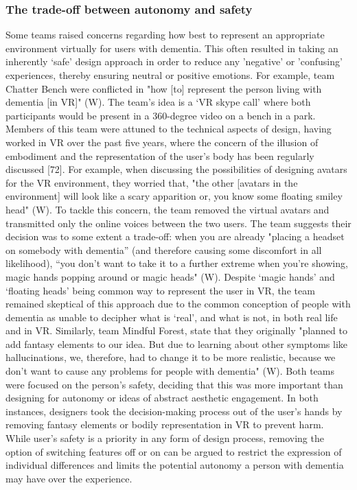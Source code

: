 \subsubsection{The trade-off between autonomy and safety}
\label{ThemeTwo:subthemeTwo}
Some teams raised concerns regarding how best to represent an appropriate environment virtually for users with dementia. This often resulted in taking an inherently ‘safe’ design approach in order to reduce any 'negative' or 'confusing' experiences, thereby ensuring neutral or positive emotions. For example, team Chatter Bench were conflicted in "how [to] represent the person living with dementia [in VR]" (W). The team's idea is a ‘VR skype call' where both participants would be present in a 360-degree video on a bench in a park. Members of this team were attuned to the technical aspects of design, having worked in VR over the past five years, where the concern of the illusion of embodiment and the representation of the user's body has been regularly discussed [72]. For example, when discussing the possibilities of designing avatars for the VR environment, they worried that, "the other [avatars in the environment] will look like a scary apparition or, you know some floating smiley head" (W). To tackle this concern, the team removed the virtual avatars and transmitted only the online voices between the two users. The team suggests their decision was to some extent a trade-off: when you are already "placing a headset on somebody with dementia” (and therefore causing some discomfort in all likelihood), “you don't want to take it to a further extreme when you're showing, magic hands popping around or magic heads" (W). Despite ‘magic hands’ and ‘floating heads’ being common way to represent the user in VR, the team remained skeptical of this approach due to the common conception of people with dementia as unable to decipher what is ‘real’, and what is not, in both real life and in VR. Similarly, team Mindful Forest, state that they originally "planned to add fantasy elements to our idea. But due to learning about other symptoms like hallucinations, we, therefore, had to change it to be more realistic, because we don't want to cause any problems for people with dementia" (W). Both teams were focused on the person’s safety, deciding that this was more important than designing for autonomy or ideas of abstract aesthetic engagement. In both instances, designers took the decision-making process out of the user’s hands by removing fantasy elements or bodily representation in VR to prevent harm. While user’s safety is a priority in any form of design process, removing the option of switching features off or on can be argued to restrict the expression of individual differences and limits the potential autonomy a person with dementia may have over the experience.
